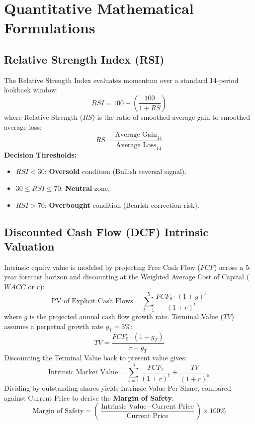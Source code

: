 \documentclass[12pt,a4paper]{report}
\begin{document}
\section{Quantitative Mathematical Formulations}

\subsection{Relative Strength Index (RSI)}
The Relative Strength Index evaluates momentum over a standard 14-period lookback window:
\begin{equation}
  RSI = 100 - \left( \frac{100}{1 + RS} \right)
\end{equation}
where Relative Strength ($RS$) is the ratio of smoothed average gain to smoothed average loss:
\begin{equation}
  RS = \frac{\text{Average Gain}_{14}}{\text{Average Loss}_{14}}
\end{equation}
\textbf{Decision Thresholds:}
\begin{itemize}[leftmargin=*]
  \item $RSI < 30$: \textbf{Oversold} condition (Bullish reversal signal).
  \item $30 \le RSI \le 70$: \textbf{Neutral} zone.
  \item $RSI > 70$: \textbf{Overbought} condition (Bearish correction risk).
\end{itemize}

\subsection{Discounted Cash Flow (DCF) Intrinsic Valuation}
Intrinsic equity value is modeled by projecting Free Cash Flow ($FCF$) across a 5-year forecast horizon and discounting at the Weighted Average Cost of Capital ($WACC$ or $r$):
\begin{equation}
  \text{PV of Explicit Cash Flows} = \sum_{t=1}^{5} \frac{FCF_0 \cdot (1 + g)^t}{(1 + r)^t}
\end{equation}
where $g$ is the projected annual cash flow growth rate. Terminal Value ($TV$) assumes a perpetual growth rate $g_T = 3\%$:
\begin{equation}
  TV = \frac{FCF_5 \cdot (1 + g_T)}{r - g_T}
\end{equation}
Discounting the Terminal Value back to present value gives:
\begin{equation}
  \text{Intrinsic Market Value} = \sum_{t=1}^{5} \frac{FCF_t}{(1 + r)^t} + \frac{TV}{(1 + r)^5}
\end{equation}
Dividing by outstanding shares yields Intrinsic Value Per Share, compared against Current Price to derive the \textbf{Margin of Safety}:
\begin{equation}
  \text{Margin of Safety} = \left( \frac{\text{Intrinsic Value} - \text{Current Price}}{\text{Current Price}} \right) \times 100\%
\end{equation}
\end{document}
